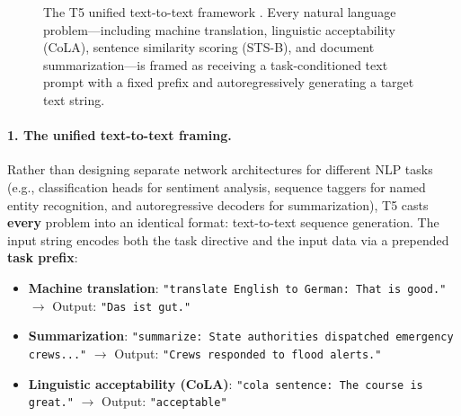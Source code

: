 \documentclass[../../main.tex]{subfiles}
\begin{document}
\begin{figure}[htbp]
{%
}
\caption{The T5 unified text-to-text framework \cite{raffel2020t5}. Every natural language problem---including machine translation, linguistic acceptability (CoLA), sentence similarity scoring (STS-B), and document summarization---is framed as receiving a task-conditioned text prompt with a fixed prefix and autoregressively generating a target text string.}
\label{fig:t5_architecture}
\end{figure}

\paragraph{1. The unified text-to-text framing.}
Rather than designing separate network architectures for different NLP tasks (e.g., classification heads for sentiment analysis, sequence taggers for named entity recognition, and autoregressive decoders for summarization), T5 casts \textbf{every} problem into an identical format: text-to-text sequence generation.
The input string encodes both the task directive and the input data via a prepended \textbf{task prefix}:
\begin{itemize}
    \item \textbf{Machine translation}: \texttt{"translate English to German: That is good."} $\longrightarrow$ Output: \texttt{"Das ist gut."}
    \item \textbf{Summarization}: \texttt{"summarize: State authorities dispatched emergency crews..."} $\longrightarrow$ Output: \texttt{"Crews responded to flood alerts."}
    \item \textbf{Linguistic acceptability (CoLA)}: \texttt{"cola sentence: The course is great."} $\longrightarrow$ Output: \texttt{"acceptable"}
\end{itemize}
\end{document}
